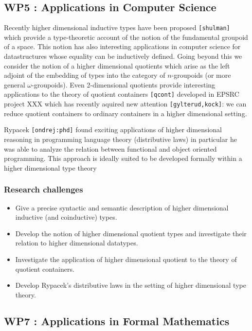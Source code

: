 \documentclass[a4paper]{article}
\renewcommand{\cite}[1]{{\tt[#1]}}
\begin{document}
\subsection*{WP5 : Applications in Computer Science} 
Recently higher dimensional inductive types have been proposed
\cite{shulman} which provide a type-theoretic account of the notion of
the fundamental groupoid of a space. This notion has also interesting
applications in computer science for datastructures whose equality can
be inductively defined. Going beyond this we consider the notion of a
higher dimensional quotients which arise as the left adjoint of the
embedding of types into the category of $n$-groupoids (or more general
$\omega$-groupoids). Even 2-dimensional quotients provide interesting
applications to the theory of quotient containers \cite{qcont}
developed in EPSRC project XXX which has recently aquired new
attention \cite{gylterud,kock}: we can reduce quotient containers to
ordinary containers in a higher dimensional setting. 

Rypacek \cite{ondrej:phd} found exciting applications of higher
dimensional reasoning in programming language theory (distributive
laws) in particular he was able to analyze the relation between
functional and object oriented programming. This approach is ideally
suited to be developed formally within a higher dimensional type theory


\subsubsection*{Research challenges}

\begin{itemize}
\item Give a precise syntactic and semantic description of higher
  dimensional inductive (and coinductive) types.
\item Develop the notion of higher dimensional quotient types and
  investigate their relation to higher dimensional datatypes.
\item Investigate the application of higher dimensional quotient to
  the theory of quotient containers.
\item Develop Rypacek's distributive laws in the setting of higher
  dimensional type theory.
\end{itemize}

\subsection*{WP7 : Applications in Formal Mathematics} 
\end{document}
